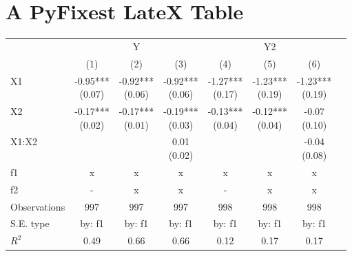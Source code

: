 \documentclass{article}%
\begin{document}
%
\normalsize%
\section{A PyFixest LateX Table}%
\label{sec:APyFixestLateXTable}%


\begin{table}[htbp]%
\renewcommand\cellalign{t}
\begin{threeparttable}
\begin{tabular}{lccccccc}
\toprule
 & \multicolumn{3}{c}{Y} & \multicolumn{3}{c}{Y2} \\
\cmidrule(lr){2-4} \cmidrule(lr){5-7}
 & (1) & (2) & (3) & (4) & (5) & (6) \\
\midrule
\addlinespace
X1 & \makecell{-0.95*** \\ (0.07)} & \makecell{-0.92*** \\ (0.06)} & \makecell{-0.92*** \\ (0.06)} & \makecell{-1.27*** \\ (0.17)} & \makecell{-1.23*** \\ (0.19)} & \makecell{-1.23*** \\ (0.19)} \\
X2 & \makecell{-0.17*** \\ (0.02)} & \makecell{-0.17*** \\ (0.01)} & \makecell{-0.19*** \\ (0.03)} & \makecell{-0.13*** \\ (0.04)} & \makecell{-0.12*** \\ (0.04)} & \makecell{-0.07 \\ (0.10)} \\
X1:X2 &  &  & \makecell{0.01 \\ (0.02)} &  &  & \makecell{-0.04 \\ (0.08)} \\
\midrule
\addlinespace
f1 & x & x & x & x & x & x \\
f2 & - & x & x & - & x & x \\
\midrule
\addlinespace
Observations & 997 & 997 & 997 & 998 & 998 & 998 \\
S.E. type & by: f1 & by: f1 & by: f1 & by: f1 & by: f1 & by: f1 \\
$R^2$ & 0.49 & 0.66 & 0.66 & 0.12 & 0.17 & 0.17 \\
\bottomrule
\end{tabular}
\footnotesize
\end{threeparttable}%
\end{table}

%
\end{document}
